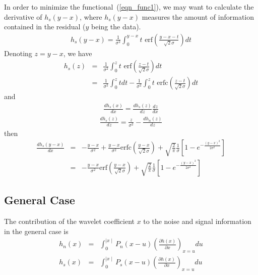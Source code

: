 In order to minimize the functional~(\ref{eqn_func1}), we may want to calculate
the derivative of $h_s(y-x)$, where $h_s(y-x)$ measures the amount 
of information
contained in the residual ($y$ being the data).
\begin{eqnarray}
h_s(y-x) = \frac{1}{\sigma^{2}} \int_{0}^{y-x} t \mbox{ erf}\left(\frac{y-x-t}{\sqrt{2}\sigma}\right) dt
\end{eqnarray}
Denoting $z = y - x$, we have
\begin{eqnarray}
h_s(z) &  =  & \frac{1}{\sigma^{2}} \int_{0}^{z} t \mbox{ erf}\left(\frac{z-t}{\sqrt{2}\sigma}\right) dt \nonumber \\
       &  =  & \frac{1}{\sigma^{2}} \int_{0}^{z} t dt - \frac{1}{\sigma^{2}} \int_{0}^{z} t \mbox{ erfc}\left(\frac{z-t}{\sqrt{2}\sigma}\right) dt
\end{eqnarray} 
and
\begin{eqnarray}
\frac{d h_s(x)}{dx} = \frac{d h_s(z)}{dz} \frac{dz}{dx}
\end{eqnarray}
\begin{eqnarray}
\frac{d h_s(z)}{dz} = \frac{z}{\sigma^2} - \frac{d h_n(z)}{dz}
 \end{eqnarray}
then
\begin{eqnarray}
\frac{d h_s(y-x)}{dx} & = & - \frac{y-x}{\sigma^2} + \frac{y-x}{\sigma^2}\mbox{erfc}\left(\frac{y-x}{\sqrt{2}\sigma}\right) + \sqrt{\frac{2}{\pi}}\frac{1}{\sigma}\left[1 - e^{-\frac{(y-x)^{2}}{2\sigma^{2}}}\right] \nonumber \\
                    & = & - \frac{y-x}{\sigma^2} \mbox{erf}\left(\frac{y-x}{\sqrt{2}\sigma}\right) + \sqrt{\frac{2}{\pi}}\frac{1}{\sigma}\left[1 - e^{-\frac{(y-x)^{2}}{2\sigma^{2}}}\right]
\label{eqn_n2_hs}
\end{eqnarray}


\subsection{General Case}
  
The contribution of the wavelet coefficient $x$ to the noise and signal
information in the general case is
\begin{eqnarray}
h_n(x) & = & \int_{0}^{\mid x \mid } P_n(x-u) \left(\frac{\partial h(x)}{\partial 
x}\right)_{x=u} du \\ \nonumber 
h_s(x) & = & \int_{0}^{\mid x \mid } P_s(x-u) \left(\frac{\partial h(x)}{\partial 
x}\right)_{x=u} du
\end{eqnarray}

